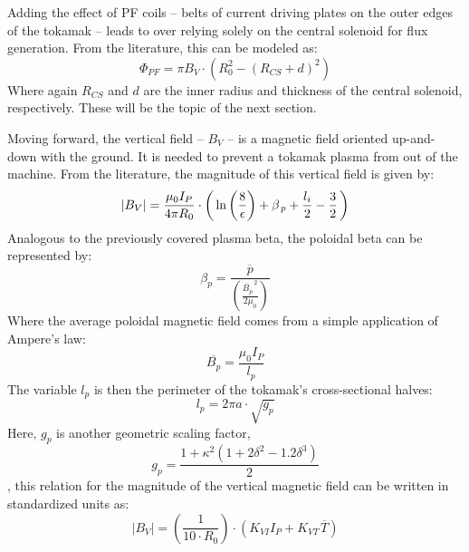 Adding the effect of PF coils -- belts of current driving plates on the outer edges of the tokamak -- leads to  over relying solely on the central solenoid for flux generation. From the literature, this can be modeled as: \cite{hartmann}
\begin{equation}
	\label{eq:phipf}
	\Phi_{PF} = \pi B_V \cdot \left( R_0^2 - ( R_{CS} + d ) ^ 2 \right)
\end{equation}
Where again $R_{CS}$ and $d$ are the inner radius and thickness of the central solenoid, respectively. These will be the topic of the next section.

Moving forward, the vertical field -- $B_V$ -- is a magnetic field oriented up-and-down with the ground. It is needed to prevent a tokamak plasma from  out of the machine. From the literature, the magnitude of this vertical field  is given by: \cite{process}
\begin{equation}
  |B_V| = \frac{\mu_0 I_P}{4 \pi R_0} \cdot \left( \,\textnormal{ln} \left(\frac{8}{\epsilon}\right) + \beta_{\,p} + \frac{l_i}{2} - \frac{3}{2} \, \right)
\end{equation} 
Analogous to the previously covered plasma beta, the poloidal beta can be represented by: \cite{elongation}
\begin{equation}
  \beta_p = \frac{\overline{p}}{\left( \frac{\overline{B_p}^{\,2}}{2 \mu_0} \right)}
\end{equation}
Where the average poloidal magnetic field comes from a simple application of Ampere's law:
\begin{equation}
	\overline{B_p} = \frac{\mu_0 I_P}{l_p}
\end{equation}
The variable $l_p$ is then the perimeter of the tokamak's cross-sectional halves:
\begin{equation}
	l_p = 2 \pi a \cdot \sqrt{g_p}
\end{equation}
Here, $g_p$ is another geometric scaling factor,
\begin{equation}
  g_p = \frac{1 + \kappa^2 ( 1 + 2 \delta^2 - 1.2\delta^3 )}{2} 
\end{equation}
, this relation for the magnitude of the vertical magnetic field can be written in standardized units as:
\begin{equation}
	|B_V| = \left( \frac{ 1 }{ 10 \cdot R_0} \right) \cdot \left( K_{VI} I_P +  K_{VT\,} \overline{T}  \right)
\end{equation}
